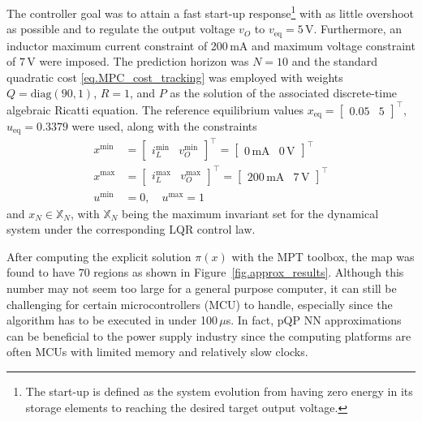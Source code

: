 The controller goal was to attain a fast start-up response\footnote{The start-up is defined as the system evolution from having zero energy in its storage elements to reaching the desired target output voltage.} with as little overshoot as possible and to regulate the output voltage $v_O$ to $v_{\text{eq}}=5\,$V. Furthermore, an inductor maximum current constraint of 200$\,$mA and maximum voltage constraint of $7\,$V were imposed. The prediction horizon was $N = 10$ and the standard quadratic cost \eqref{eq.MPC_cost_tracking} was employed with weights $Q = \text{diag}(90,1)$, $R = 1$, and $P$ as the solution of the associated discrete-time algebraic Ricatti equation. The reference equilibrium values $x_{\text{eq}} = \begin{bmatrix} 0.05 & 5 \end{bmatrix}^\top$, $u_{\text{eq}} = 0.3379$ were used, along with the constraints
\begin{align}
	x^{\text{min}} &= 
	\begin{bmatrix} i_L^{\text{min}} & v_O^{\text{min}}\end{bmatrix}^\top = 
	\begin{bmatrix} 0 \, \text{mA} & 0 \, \text{V}\end{bmatrix}^\top \\[3pt]
	x^{\text{max}} &= 
	\begin{bmatrix} i_L^{\text{max}} & v_O^{\text{max}}\end{bmatrix}^\top = 
	\begin{bmatrix} 200 \, \text{mA} & 7 \, \text{V}\end{bmatrix}^\top \\[3pt]
	u^{\text{min}} &= 0, \quad u^{\text{max}} = 1 
\end{align}
%
and $x_N \in \mathbb{X}_N$, with $\mathbb{X}_N$ being the maximum invariant set for the dynamical system under the corresponding LQR control law.

After computing the explicit solution $\pi(x)$ with the MPT toolbox, the map was found to have $70$ regions as shown in Figure~\ref{fig.approx_results}. Although this number may not seem too large for a general purpose computer, it can still be challenging for certain microcontrollers (MCU) to handle, especially since the algorithm has to be executed in under 100$\,\mu$s. In fact, pQP NN approximations can be beneficial to the power supply industry since the computing platforms are often MCUs with limited memory and relatively slow clocks.


